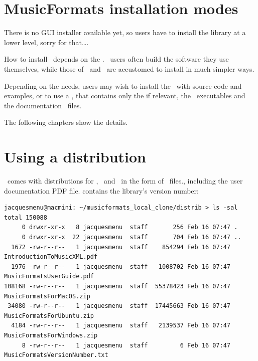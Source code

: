 
\chapter{MusicFormats installation modes}

There is no GUI installer available yet, so users have to install the library at a lower level, sorry for that\dots.

How to install \mf\ depends on the \OS. \Linux\ users often build the software they use themselves, while those of \Windows\ and \MacOS\ are accustomed to install in much simpler ways.

Depending on the needs, users may wish to install the  \mf\ with source code and examples, or to use a , that contains only the  if relevant, the \CLI\ executables and the documentation \pdf\ files.

The following chapters show the details.


\chapter{Using a distribution}

\mf\ comes with distributions for \MacOS, \Ubuntu\ and \Windows\ in the form of \zip\ files., including the user documentation PDF file.  contains the library's version number:
\begin{lstlisting}[language=Terminal]
jacquesmenu@macmini: ~/musicformats_local_clone/distrib > ls -sal
total 150088
     0 drwxr-xr-x   8 jacquesmenu  staff       256 Feb 16 07:47 .
     0 drwxr-xr-x  22 jacquesmenu  staff       704 Feb 16 07:47 ..
  1672 -rw-r--r--   1 jacquesmenu  staff    854294 Feb 16 07:47 IntroductionToMusicXML.pdf
  1976 -rw-r--r--   1 jacquesmenu  staff   1008702 Feb 16 07:47 MusicFormatsUserGuide.pdf
108168 -rw-r--r--   1 jacquesmenu  staff  55378423 Feb 16 07:47 MusicFormatsForMacOS.zip
 34080 -rw-r--r--   1 jacquesmenu  staff  17445663 Feb 16 07:47 MusicFormatsForUbuntu.zip
  4184 -rw-r--r--   1 jacquesmenu  staff   2139537 Feb 16 07:47 MusicFormatsForWindows.zip
     8 -rw-r--r--   1 jacquesmenu  staff         6 Feb 16 07:47 MusicFormatsVersionNumber.txt
\end{lstlisting}

